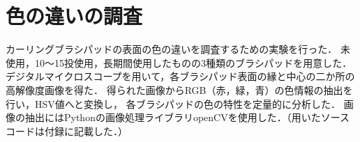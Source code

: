 \documentclass[main]{subfiles}
\begin{document}
\section{色の違いの調査}
カーリングブラシパッドの表面の色の違いを調査するための実験を行った．
未使用，10～15投使用，長期間使用したものの3種類のブラシパッドを用意した．
デジタルマイクロスコープを用いて，各ブラシパッド表面の縁と中心の二か所の高解像度画像を得た．
得られた画像からRGB（赤，緑，青）の色情報の抽出を行い，HSV値へと変換し，
各ブラシパッドの色の特性を定量的に分析した．
画像の抽出にはPythonの画像処理ライブラリopenCVを使用した．（用いたソースコードは付録に記載した．）
\end{document}
